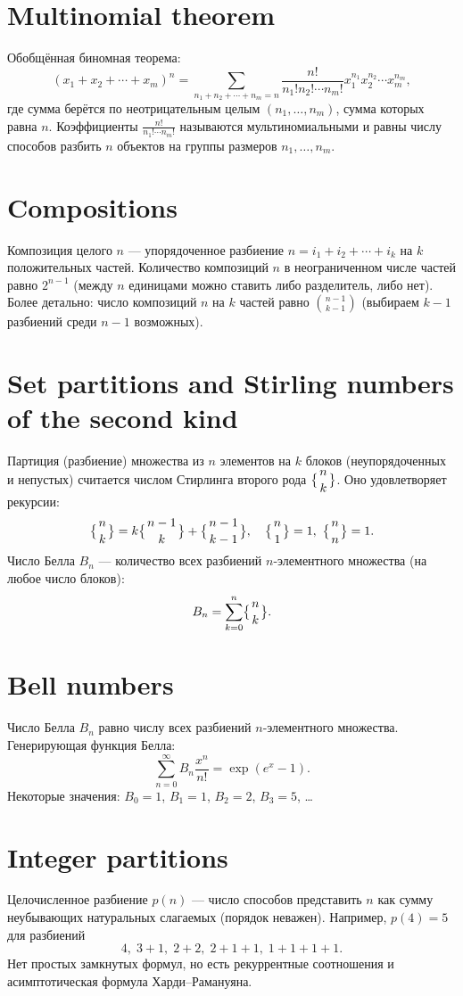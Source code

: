 \documentclass{article}
\begin{document}
	\section{Multinomial theorem}
	Обобщённая биномная теорема:
	\[
	(x_1 + x_2 + \cdots + x_m)^n = \sum_{n_1+n_2+\cdots+n_m=n} \frac{n!}{n_1!n_2!\cdots n_m!} x_1^{n_1}x_2^{n_2}\cdots x_m^{n_m},
	\]
	где сумма берётся по неотрицательным целым $(n_1,\dots,n_m)$, сумма которых равна $n$. Коэффициенты $\displaystyle \frac{n!}{n_1!\cdots n_m!}$ называются мультиномиальными и равны числу способов разбить $n$ объектов на группы размеров $n_1,\dots,n_m$.
	
	\section{Compositions}
	Композиция целого $n$ --- упорядоченное разбиение $n = i_1 + i_2 + \cdots + i_k$ на $k$ положительных частей. Количество композиций $n$ в неограниченном числе частей равно $2^{n-1}$ (между $n$ единицами можно ставить либо разделитель, либо нет). Более детально: число композиций $n$ на $k$ частей равно $\displaystyle \binom{n-1}{k-1}$ (выбираем $k-1$ разбиений среди $n-1$ возможных).
	
	\section{Set partitions and Stirling numbers of the second kind}
	Партиция (разбиение) множества из $n$ элементов на $k$ блоков (неупорядоченных и непустых) считается числом Стирлинга второго рода $\displaystyle \bigl\{{n\atop k}\bigr\}$. Оно удовлетворяет рекурсии:
	\[
	\bigl\{{n\atop k}\bigr\} = k\bigl\{{n-1\atop k}\bigr\} + \bigl\{{n-1\atop k-1}\bigr\}, 
	\quad \bigl\{{n\atop 1}\bigr\}=1,\ \bigl\{{n\atop n}\bigr\}=1.
	\]
	Число Белла $B_n$ --- количество всех разбиений $n$-элементного множества (на любое число блоков):
	\[
	B_n = \sum_{k=0}^n \bigl\{{n\atop k}\bigr\}.
	\]
	
	\section{Bell numbers}
	Число Белла $B_n$ равно числу всех разбиений $n$-элементного множества. Генерирующая функция Белла:
	\[
	\sum_{n=0}^\infty B_n \frac{x^n}{n!} = \exp(e^x - 1).
	\]
	Некоторые значения: $B_0=1$, $B_1=1$, $B_2=2$, $B_3=5$, \dots
	
	\section{Integer partitions}
	Целочисленное разбиение $p(n)$ --- число способов представить $n$ как сумму неубывающих натуральных слагаемых (порядок неважен). Например, $p(4)=5$ для разбиений 
	\[
	4,\;3+1,\;2+2,\;2+1+1,\;1+1+1+1.
	\]
	Нет простых замкнутых формул, но есть рекуррентные соотношения и асимптотическая формула Харди--Рамануяна.
	
\end{document}
